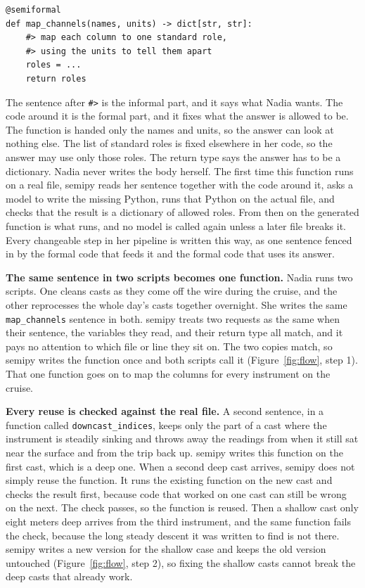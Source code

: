 \documentclass[9pt]{extarticle}
\begin{document}
\begin{verbatim}
@semiformal
def map_channels(names, units) -> dict[str, str]:
    #> map each column to one standard role,
    #> using the units to tell them apart
    roles = ...
    return roles
\end{verbatim}

The sentence after \verb|#>| is the informal part, and it says what Nadia
wants. The code around it is the formal part, and it fixes what the answer is
allowed to be. The function is handed only the names and units, so the answer
can look at nothing else. The list of standard roles is fixed elsewhere in her
code, so the answer may use only those roles. The return type says the answer
has to be a dictionary. Nadia never writes the body herself. The first time
this function runs on a real file, semipy reads her sentence together with the
code around it, asks a model to write the missing Python, runs that Python on
the actual file, and checks that the result is a dictionary of allowed roles.
From then on the generated function is what runs, and no model is called again
unless a later file breaks it. Every changeable step in her pipeline is
written this way, as one sentence fenced in by the formal code that feeds it
and the formal code that uses its answer.

\textbf{The same sentence in two scripts becomes one function.} Nadia runs two
scripts. One cleans casts as they come off the wire during the cruise, and the
other reprocesses the whole day's casts together overnight. She writes the
same \verb|map_channels| sentence in both. semipy treats two requests as the
same when their sentence, the variables they read, and their return type all
match, and it pays no attention to which file or line they sit on. The two
copies match, so semipy writes the function once and both scripts call it
(Figure~\ref{fig:flow}, step 1). That one function goes on to map the columns
for every instrument on the cruise.

\textbf{Every reuse is checked against the real file.} A second sentence, in a
function called \verb|downcast_indices|, keeps only the part of a cast where
the instrument is steadily sinking and throws away the readings from when it
still sat near the surface and from the trip back up. semipy writes this
function on the first cast, which is a deep one. When a second deep cast
arrives, semipy does not simply reuse the function. It runs the existing
function on the new cast and checks the result first, because code that worked
on one cast can still be wrong on the next. The check passes, so the function
is reused. Then a shallow cast only eight meters deep arrives from the third
instrument, and the same function fails the check, because the long steady
descent it was written to find is not there. semipy writes a new version for
the shallow case and keeps the old version untouched (Figure~\ref{fig:flow},
step 2), so fixing the shallow casts cannot break the deep casts that already
work.
\end{document}
